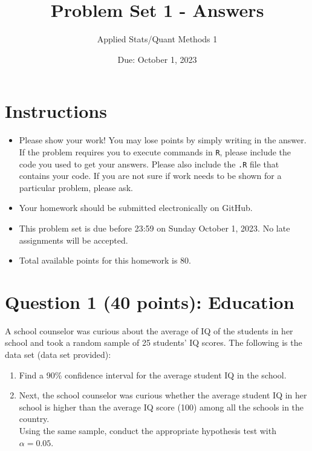 \documentclass[12pt,letterpaper]{article}
\title{Problem Set 1 - Answers}
\date{Due: October 1, 2023}
\author{Applied Stats/Quant Methods 1}
\begin{document}
	\maketitle
	
	\section*{Instructions}
	\begin{itemize}
	\item Please show your work! You may lose points by simply writing in the answer. If the problem requires you to execute commands in \texttt{R}, please include the code you used to get your answers. Please also include the \texttt{.R} file that contains your code. If you are not sure if work needs to be shown for a particular problem, please ask.
\item Your homework should be submitted electronically on GitHub.
\item This problem set is due before 23:59 on Sunday October 1, 2023. No late assignments will be accepted.
\item Total available points for this homework is 80.
	\end{itemize}
	
	\vspace{1cm}
	\section*{Question 1 (40 points): Education}

A school counselor was curious about the average of IQ of the students in her school and took a random sample of 25 students' IQ scores. The following is the data set (data set provided):\\
\vspace{.5cm}

\vspace{1cm}

\begin{enumerate}
	\item Find a 90\% confidence interval for the average student IQ in the school.\\
	
	\item Next, the school counselor was curious  whether  the average student IQ in her school is higher than the average IQ score (100) among all the schools in the country.\\ 
	
	\noindent Using the same sample, conduct the appropriate hypothesis test with $\alpha=0.05$.
\end{enumerate}
\end{document}
